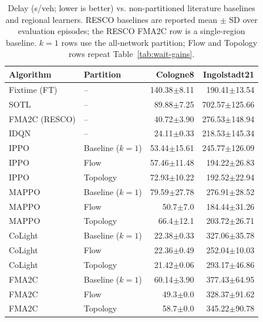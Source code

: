 \documentclass[journal]{IEEEtran}
\theoremstyle{definition}
\begin{document}
\begin{table}[t]
    \centering
    \caption{Delay (s/veh; lower is better) vs. non-partitioned literature baselines and regional learners. RESCO baselines are reported mean $\pm$ SD over evaluation episodes; the RESCO FMA2C row is a single-region baseline. $k{=}1$ rows use the all-network partition; Flow and Topology rows repeat Table~\ref{tab:wait-gains}.}
    \label{tab:baselines}
    \scriptsize
    \setlength{\tabcolsep}{4pt}
    \begin{tabular}{llrr}
        \toprule
        Algorithm     & Partition          & Cologne8        & Ingolstadt21      \\
        \midrule
        Fixtime (FT)  & --                 & 140.38$\pm$8.11 & 190.41$\pm$13.54  \\
        SOTL          & --                 & 89.88$\pm$7.25  & 702.57$\pm$125.66 \\
        FMA2C (RESCO) & --                 & 40.72$\pm$3.90  & 276.53$\pm$148.94 \\
        IDQN          & --                 & 24.11$\pm$0.33  & 218.53$\pm$145.34 \\
        \addlinespace
        IPPO          & Baseline ($k{=}1$) & 53.44$\pm$15.61 & 245.77$\pm$126.09 \\
        IPPO          & Flow               & 57.46$\pm$11.48 & 194.22$\pm$26.83  \\
        IPPO          & Topology           & 72.93$\pm$10.22 & 192.52$\pm$22.94  \\
        \addlinespace
        MAPPO         & Baseline ($k{=}1$) & 79.59$\pm$27.78 & 276.91$\pm$28.52  \\
        MAPPO         & Flow               & 50.7$\pm$7.0    & 184.44$\pm$31.26  \\
        MAPPO         & Topology           & 66.4$\pm$12.1   & 203.72$\pm$26.71  \\
        \addlinespace
        CoLight       & Baseline ($k{=}1$) & 22.38$\pm$0.33  & 327.06$\pm$35.78  \\
        CoLight       & Flow               & 22.36$\pm$0.49  & 252.04$\pm$10.03  \\
        CoLight       & Topology           & 21.42$\pm$0.06  & 293.17$\pm$46.86  \\
        \addlinespace
        FMA2C         & Baseline ($k{=}1$) & 60.14$\pm$3.90  & 377.43$\pm$64.95  \\
        FMA2C         & Flow               & 49.3$\pm$0.0    & 328.37$\pm$91.62  \\
        FMA2C         & Topology           & 58.7$\pm$0.0    & 345.22$\pm$90.78  \\
        \bottomrule
    \end{tabular}
\end{table}
\end{document}
